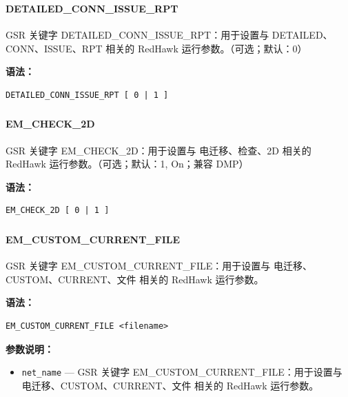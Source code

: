\subsubsection{}
\paragraph*{DETAILED_CONN_ISSUE_RPT}

GSR 关键字 DETAILED_CONN_ISSUE_RPT：用于设置与 DETAILED、CONN、ISSUE、RPT 相关的 RedHawk 运行参数。（可选；默认：0）

\textbf{语法：}
\begin{lstlisting}
DETAILED_CONN_ISSUE_RPT [ 0 | 1 ]
\end{lstlisting}

\subsubsection{}
\paragraph*{EM_CHECK_2D}

GSR 关键字 EM_CHECK_2D：用于设置与 电迁移、检查、2D 相关的 RedHawk 运行参数。（可选；默认：1, On；兼容 DMP）

\textbf{语法：}
\begin{lstlisting}
EM_CHECK_2D [ 0 | 1 ]
\end{lstlisting}

\subsubsection{}
\paragraph*{EM_CUSTOM_CURRENT_FILE}

GSR 关键字 EM_CUSTOM_CURRENT_FILE：用于设置与 电迁移、CUSTOM、CURRENT、文件 相关的 RedHawk 运行参数。

\textbf{语法：}
\begin{lstlisting}
EM_CUSTOM_CURRENT_FILE <filename>
\end{lstlisting}

\textbf{参数说明：}
\begin{itemize}
\item \texttt{net\_name} — GSR 关键字 EM\_CUSTOM\_CURRENT\_FILE：用于设置与 电迁移、CUSTOM、CURRENT、文件 相关的 RedHawk 运行参数。
\end{itemize}

